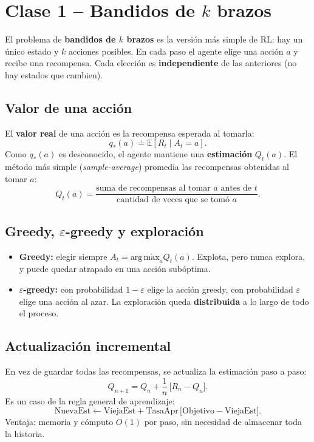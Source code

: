 \documentclass[11pt, a4paper]{article}
\newcommand{\argmax}{\operatorname*{arg\,m\acute{a}x}}
\begin{document}
\section{Clase 1 -- Bandidos de $k$ brazos}

El problema de \textbf{bandidos de $k$ brazos} es la versi\'on m\'as simple de RL: hay un \'unico estado y $k$ acciones posibles. En cada paso el agente elige una acci\'on $a$ y recibe una recompensa. Cada elecci\'on es \textbf{independiente} de las anteriores (no hay estados que cambien).

\subsection{Valor de una acci\'on}
El \textbf{valor real} de una acci\'on es la recompensa esperada al tomarla:
\[
    q_*(a) \doteq \mathbb{E}[R_t \mid A_t = a].
\]
Como $q_*(a)$ es desconocido, el agente mantiene una \textbf{estimaci\'on} $Q_t(a)$. El m\'etodo m\'as simple (\emph{sample-average}) promedia las recompensas obtenidas al tomar $a$:
\[
    Q_t(a) = \frac{\text{suma de recompensas al tomar } a \text{ antes de } t}{\text{cantidad de veces que se tom\'o } a}.
\]

\subsection{Greedy, $\varepsilon$-greedy y exploraci\'on}
\begin{itemize}[nosep]
    \item \textbf{Greedy:} elegir siempre $A_t = \argmax_a Q_t(a)$. Explota, pero nunca explora, y puede quedar atrapado en una acci\'on sub\'optima.
    \item \textbf{$\varepsilon$-greedy:} con probabilidad $1-\varepsilon$ elige la acci\'on greedy, con probabilidad $\varepsilon$ elige una acci\'on al azar. La exploraci\'on queda \textbf{distribuida} a lo largo de todo el proceso.
\end{itemize}

\subsection{Actualizaci\'on incremental}
En vez de guardar todas las recompensas, se actualiza la estimaci\'on paso a paso:
\[
    Q_{n+1} = Q_n + \frac{1}{n}\,\big[R_n - Q_n\big].
\]
Es un caso de la regla general de aprendizaje:
\[
    \text{NuevaEst} \leftarrow \text{ViejaEst} + \text{TasaApr}\,\big[\text{Objetivo} - \text{ViejaEst}\big].
\]
Ventaja: memoria y c\'omputo $O(1)$ por paso, sin necesidad de almacenar toda la historia.
\end{document}
